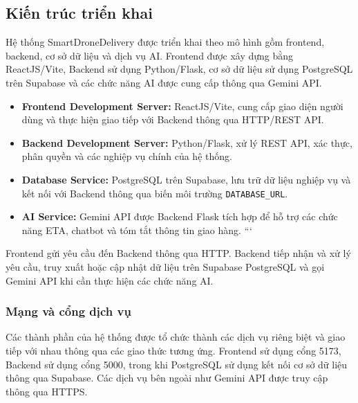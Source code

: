 \subsection{Kiến trúc triển khai}

Hệ thống SmartDroneDelivery được triển khai theo mô hình gồm frontend, backend, cơ sở dữ liệu và dịch vụ AI. Frontend được xây dựng bằng ReactJS/Vite, Backend sử dụng Python/Flask, cơ sở dữ liệu sử dụng PostgreSQL trên Supabase và các chức năng AI được cung cấp thông qua Gemini API.

\begin{itemize}

```
\item \textbf{Frontend Development Server:} ReactJS/Vite, cung cấp giao diện người dùng và thực hiện giao tiếp với Backend thông qua HTTP/REST API.

\item \textbf{Backend Development Server:} Python/Flask, xử lý REST API, xác thực, phân quyền và các nghiệp vụ chính của hệ thống.

\item \textbf{Database Service:} PostgreSQL trên Supabase, lưu trữ dữ liệu nghiệp vụ và kết nối với Backend thông qua biến môi trường \texttt{DATABASE\_URL}.

\item \textbf{AI Service:} Gemini API được Backend Flask tích hợp để hỗ trợ các chức năng ETA, chatbot và tóm tắt thông tin giao hàng.
```

\end{itemize}

Frontend gửi yêu cầu đến Backend thông qua HTTP. Backend tiếp nhận và xử lý yêu cầu, truy xuất hoặc cập nhật dữ liệu trên Supabase PostgreSQL và gọi Gemini API khi cần thực hiện các chức năng AI.

\subsubsection{Mạng và cổng dịch vụ}

Các thành phần của hệ thống được tổ chức thành các dịch vụ riêng biệt và giao tiếp với nhau thông qua các giao thức tương ứng. Frontend sử dụng cổng 5173, Backend sử dụng cổng 5000, trong khi PostgreSQL sử dụng kết nối cơ sở dữ liệu thông qua Supabase. Các dịch vụ bên ngoài như Gemini API được truy cập thông qua HTTPS.

